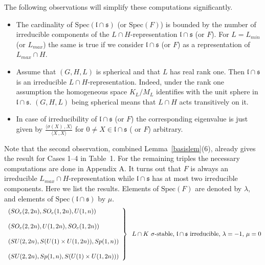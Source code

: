 \documentclass[10]{amsart}
\theoremstyle{remark}
\theoremstyle{definition}
\numberwithin{equation}{section}
\newcommand{\fl}{{\mathfrak l}}
\newcommand{\fs}{{\mathfrak s}}
\newcommand{\IP}[2]{\langle#1\,, #2\rangle}     %
\begin{document}
{The following observations will simplify these computations significantly.
\begin{itemize}
\item The cardinality of $\mathrm{Spec}(\fl\cap\fs)$ (or $\mathrm{Spec}(F)$) is bounded by the number of irreducible components of the $L\cap H$-representation $\fl\cap\fs$ (or $F$).
For $L=L_{min}$ (or $L_{max}$) the same is true if we consider $\fl\cap\fs$ (or $F$) as a representation of $L_{max}\cap H$.
\item Assume that $(G,H,L)$ is spherical and that $L$ has real rank one. Then $\fl\cap\fs$ is an irreducible $L\cap H$-representation. Indeed, under the rank one assumption the homogeneous space
$K_L/M_L$ identifies with the unit sphere in $\fl\cap\fs$.  $(G,H,L)$ being spherical means that $L\cap H$ acts transitively on it.
\item In case of irreducibility of $\fl\cap\fs$ (or $F$) the corresponding eigenvalue is just given by $\frac{\IP{\sigma(X)}{X}}{\IP{X}{X}}$ for $0\ne X\in\fl\cap\fs$ ( or $F$) arbitrary.
\end{itemize}
%
Note that the second observation, combined Lemma~\ref{basislem}(6), already gives the result for Cases 1--4 in Table~1. For the remaining triples the necessary computations
are done in Appendix A. It turns out that $F$ is always an irreducible $L_{max}\cap H$-representation while $\fl\cap\fs$ has at most two irreducible components.
Here we list the results. Elements of $\mathrm{Spec}(F)$ are denoted by $\lambda$, and elements of $\mathrm{Spec}(\fl\cap\fs)$ by $\mu$.
%
\vspace*{0.2cm}\\
\begin{equation*}
 \left.
 \begin{array}{ll}
     (SO_e(2,2n),SO_e(1,2n),U(1,n))\\
     \\
     (SO_e(2,2n),U(1,2n),SO_e(1,2n))\\
     \\
     (SU(2,2n),S(U(1)\times U(1,2n)),Sp(1,n))\\
     \\
     (SU(2,2n),Sp(1,n),S(U(1)\times U(1,2n)))
    \end{array}
   \right \}\hspace*{0.2cm}L\cap K\text{ $\sigma$-stable, $\fl\cap\fs$ irreducible, $\lambda=-1$, $\mu=0$}
  \end{equation*}
%
\vspace*{0.1cm}\\
}
\end{document}
